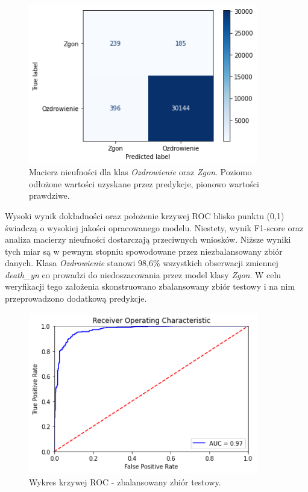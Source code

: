 \documentclass[polish, twoside, 12pt, a4paper]{article}
\theoremstyle{definition}
\theoremstyle{plain}
\theoremstyle{remark}
\begin{document}
\begin{figure}[H]
\centering
\includegraphics[width=10cm]{conf_matrix.png}
\caption{Macierz nieufności dla klas \emph{Ozdrowienie} oraz \emph{Zgon}. Poziomo odłożone wartości uzyskane przez predykcje, pionowo wartości prawdziwe. }
\end{figure}

Wysoki wynik dokładności oraz położenie krzywej ROC blisko punktu (0,1) świadczą o wysokiej jakości opracowanego modelu. Niestety, wynik F1-score oraz analiza macierzy nieufności dostarczają przeciwnych wniosków. Niższe wyniki tych miar są w pewnym stopniu spowodowane przez niezbalansowany zbiór danych. Klasa \emph{Ozdrowienie} stanowi 98,6\% wszystkich obserwacji zmiennej \emph{death\_yn} co prowadzi do niedoszacowania przez model klasy \emph{Zgon}. W celu weryfikacji tego założenia skonstruowano zbalansowany zbiór testowy i na nim przeprowadzono dodatkową predykcje. 

\begin{figure}[H]
\centering
\includegraphics[width=10cm]{roc-bs.png}
\caption{Wykres krzywej ROC - zbalansowany zbiór testowy.}
\end{figure}
\end{document}
